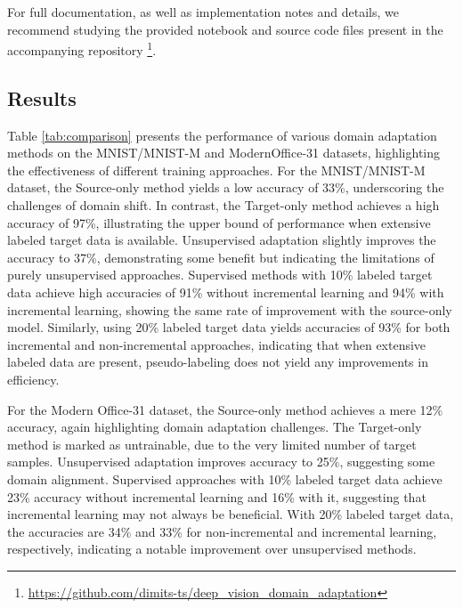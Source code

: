 \documentclass{article}
\begin{document}
	For full documentation, as well as implementation notes and details, we recommend studying the provided notebook and source code files present in the accompanying repository \footnote{\url{https://github.com/dimits-ts/deep\_vision\_domain\_adaptation}}.
	
	
	\subsection{Results}
	
	Table \ref{tab:comparison} presents the performance of various domain adaptation methods on the MNIST/MNIST-M and ModernOffice-31 datasets, highlighting the effectiveness of different training approaches. For the MNIST/MNIST-M dataset, the Source-only method yields a low accuracy of 33\%, underscoring the challenges of domain shift. In contrast, the Target-only method achieves a high accuracy of 97\%, illustrating the upper bound of performance when extensive labeled target data is available. Unsupervised adaptation slightly improves the accuracy to 37\%, demonstrating some benefit but indicating the limitations of purely unsupervised approaches. Supervised methods with 10\% labeled target data achieve high accuracies of 91\% without incremental learning and 94\% with incremental learning, showing the same rate of improvement with the source-only model. Similarly, using 20\% labeled target data yields accuracies of 93\% for both incremental and non-incremental approaches, indicating that when extensive labeled data are present, pseudo-labeling does not yield any improvements in efficiency.
	
	For the Modern Office-31 dataset, the Source-only method achieves a mere 12\% accuracy, again highlighting domain adaptation challenges. The Target-only method is marked as untrainable, due to the very limited number of target samples. Unsupervised adaptation improves accuracy to 25\%, suggesting some domain alignment. Supervised approaches with 10\% labeled target data achieve 23\% accuracy without incremental learning and 16\% with it, suggesting that incremental learning may not always be beneficial. With 20\% labeled target data, the accuracies are 34\% and 33\% for non-incremental and incremental learning, respectively, indicating a notable improvement over unsupervised methods. 

	
\end{document}
